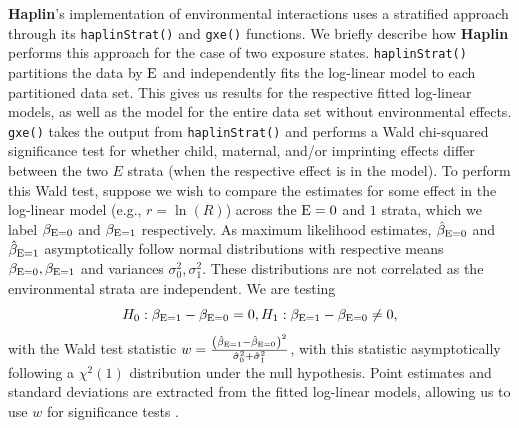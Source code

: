 \textbf{Haplin}'s implementation of environmental interactions uses a stratified approach through its \texttt{haplinStrat()} and \texttt{gxe()} functions\cite{GjesLie06, Juge+12}.
We briefly describe how \textbf{Haplin} performs this approach for the case of two exposure states.
\texttt{haplinStrat()} partitions the data by ${\rm E}$ and independently fits the log-linear model to each partitioned data set.
This gives us results for the respective fitted log-linear models, as well as the model for the entire data set without environmental effects.
\texttt{gxe()} takes the output from \texttt{haplinStrat()} and performs a Wald chi-squared significance test for whether child, maternal, and/or imprinting effects differ between the two $E$ strata (when the respective effect is in the model).
To perform this Wald test, suppose we wish to compare the estimates for some effect in the log-linear model (e.g., $r = \ln(R)$) across the ${\rm E}=0$ and $1$ strata, which we label $\beta_{{\rm E}=0}$ and $\beta_{{\rm E}=1}$ respectively.
As maximum likelihood estimates, $\hat{\beta}_{{\rm E}=0}$ and $\hat{\beta}_{{\rm E}=1}$ asymptotically follow normal distributions with respective means $\beta_{{\rm E}=0}, \beta_{{\rm E}=1}$ and variances $\sigma_0^2, \sigma_1^2$.
These distributions are not correlated as the environmental strata are independent.
We are testing
\begin{equation*}
  H_0: \beta_{{\rm E}=1} - \beta_{{\rm E}=0} = 0, H_1: \beta_{{\rm E}=1} - \beta_{{\rm E}=0} \neq 0,
\end{equation*}
with the Wald test statistic $w = \frac{\left(\hat{\beta}_{{\rm E}=1} - \hat{\beta}_{{\rm E}=0}\right)^2}{\hat{\sigma}_0^2 + \hat{\sigma}_1^2}$, with this statistic asymptotically following a $\chi^2(1)$ distribution under the null hypothesis.
Point estimates and standard deviations are extracted from the fitted log-linear models, allowing us to use $w$ for significance tests \cite{Gjer+18}.

